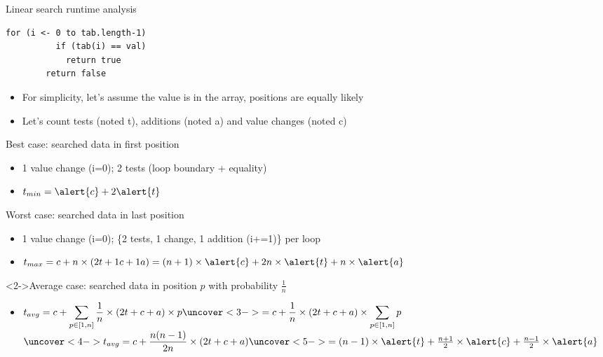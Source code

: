 \begin{frame}[fragile]{Linear search runtime analysis}
  \begin{center}\vspace{-.6\baselineskip}      
    \begin{minipage}{.6\linewidth}
    \begin{Verbatim}[frame=single,fontsize=\footnotesize,gobble=6]
        for (i <- 0 to tab.length-1)
          if (tab(i) == val)
            return true
        return false
    \end{Verbatim}      
    \end{minipage}
    \end{center}\vspace{-.3\baselineskip}

    \begin{itemize}
    \item For simplicity, let's assume the value is in the array,
      positions are equally likely
    \item Let's count tests (noted \alert{t}), 
      additions (noted \alert{a}) and 
      value changes (noted \alert{c})
    \end{itemize}


  \begin{block}{Best case: searched data in first position}
    \begin{itemize}
    \item 1 value change (i=0); 2 tests  (loop boundary + equality)
    \item $ t_{min}=\alert{c}+2\alert{t}$
    \end{itemize}
  \end{block}\vspace{-.5\baselineskip}
  \begin{block}{Worst case: searched data in last position}
    \begin{itemize}
    \item 1 value change (i=0); \{2 tests, 1 change, 1 addition (i+=1)\} per loop
    \item $t_{max}=c+n\times(2t+1c+1a)=(n+1)\times\alert{c}+2n\times\alert{t}+n\times\alert{a}$
    \end{itemize}
  \end{block}\vspace{-.5\baselineskip}

  \begin{block}<2->{Average case: searched data in position $p$ with
      probability $\frac{1}{n}$}
    \begin{itemize}
    \item {\small$\displaystyle t_{avg}
        =c+\sum_{p\in[1,n]}\frac{1}{n}\times (2t+c+a)\times p
        \uncover<3->{=c+\frac{1}{n}\times(2t+c+a)\times\sum_{p\in[1,n]}p}$}\\
      {\small$\uncover<4->{\displaystyle t_{avg}
        =c+\frac{n(n-1)}{2n}\times(2t+c+a)}
        \uncover<5->{
        =(n-1)\times\alert{t}+\frac{n+1}{2}\times\alert{c}+\frac{n-1}{2}\times\alert{a}}
        $}
    \end{itemize}
  \end{block}
\end{frame}
